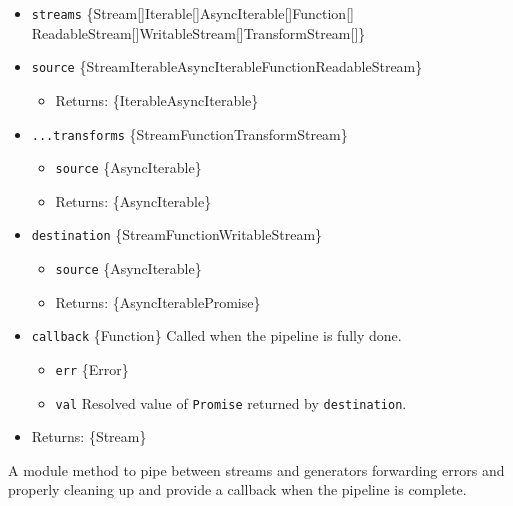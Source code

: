 \begin{itemize}
\tightlist
\item
  \texttt{streams}
  \{Stream{[}{]}\textbar Iterable{[}{]}\textbar AsyncIterable{[}{]}\textbar Function{[}{]}\textbar{}
  ReadableStream{[}{]}\textbar WritableStream{[}{]}\textbar TransformStream{[}{]}\}
\item
  \texttt{source}
  \{Stream\textbar Iterable\textbar AsyncIterable\textbar Function\textbar ReadableStream\}

  \begin{itemize}
  \tightlist
  \item
    Returns: \{Iterable\textbar AsyncIterable\}
  \end{itemize}
\item
  \texttt{...transforms}
  \{Stream\textbar Function\textbar TransformStream\}

  \begin{itemize}
  \tightlist
  \item
    \texttt{source} \{AsyncIterable\}
  \item
    Returns: \{AsyncIterable\}
  \end{itemize}
\item
  \texttt{destination}
  \{Stream\textbar Function\textbar WritableStream\}

  \begin{itemize}
  \tightlist
  \item
    \texttt{source} \{AsyncIterable\}
  \item
    Returns: \{AsyncIterable\textbar Promise\}
  \end{itemize}
\item
  \texttt{callback} \{Function\} Called when the pipeline is fully done.

  \begin{itemize}
  \tightlist
  \item
    \texttt{err} \{Error\}
  \item
    \texttt{val} Resolved value of \texttt{Promise} returned by
    \texttt{destination}.
  \end{itemize}
\item
  Returns: \{Stream\}
\end{itemize}

A module method to pipe between streams and generators forwarding errors
and properly cleaning up and provide a callback when the pipeline is
complete.

